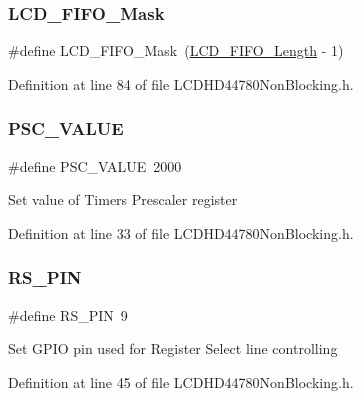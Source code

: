 \subsubsection{\texorpdfstring{LCD\_FIFO\_Mask}{LCD\_FIFO\_Mask}}
{\footnotesize\ttfamily \#define L\+C\+D\+\_\+\+F\+I\+F\+O\+\_\+\+Mask~(\mbox{\hyperlink{group___l_c_d_h_d44780_non_blocking_gabadb170a13a0a14adb963ef388742618_gabadb170a13a0a14adb963ef388742618}{L\+C\+D\+\_\+\+F\+I\+F\+O\+\_\+\+Length}} -\/ 1)}



Definition at line 84 of file L\+C\+D\+H\+D44780\+Non\+Blocking.\+h.

\mbox{\label{group___l_c_d_h_d44780_non_blocking_ga075ad9c307430a82bf41cfaf18c6a3eb_ga075ad9c307430a82bf41cfaf18c6a3eb}} 
\subsubsection{\texorpdfstring{PSC\_VALUE}{PSC\_VALUE}}
{\footnotesize\ttfamily \#define P\+S\+C\+\_\+\+V\+A\+L\+UE~2000}

Set value of Timer\textquotesingle{}s Prescaler register 

Definition at line 33 of file L\+C\+D\+H\+D44780\+Non\+Blocking.\+h.

\mbox{\label{group___l_c_d_h_d44780_non_blocking_gab36f7bcb538b332ae44f0b2b2375b2de_gab36f7bcb538b332ae44f0b2b2375b2de}} 
\subsubsection{\texorpdfstring{RS\_PIN}{RS\_PIN}}
{\footnotesize\ttfamily \#define R\+S\+\_\+\+P\+IN~9}

Set G\+P\+IO pin used for Register Select line controlling 

Definition at line 45 of file L\+C\+D\+H\+D44780\+Non\+Blocking.\+h.

\mbox{\label{group___l_c_d_h_d44780_non_blocking_gaa248ce15f60160605547ab333489781b_gaa248ce15f60160605547ab333489781b}} 
